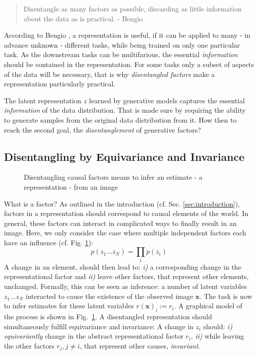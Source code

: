 	\begin{quote}
		{Disentangle as many factors as possible, discarding as little information about the data as is practical.} - Bengio \etal \cite{bengio13rep} %
	\end{quote}

	According to Bengio \etal \cite{bengio13rep}, a representation is useful, if it can be applied to many - in advance unknown - different tasks, while being trained on only one particular task.
	As the downstream tasks can be multifarious, the essential \textit{information} should be contained in the representation.
	For some tasks only a subset of aspects of the data will be necessary, that is why \textit{disentangled factors} make a representation particularly practical.

	The latent representation $z$ learned by generative models captures the essential \textit{information} of the data distribution. That is made sure by requiring the ability to generate samples from the original data distribution from it.
	How then to reach the second goal, the \textit{disentanglement} of generative factors?

	\subsection{Disentangling by Equivariance and Invariance}
		\begin{figure}[htp]
			\centering
			
			\caption{Disentangling causal factors means to infer an estimate - \ie a representation - from an image}
			\label{fig:infer}
		\end{figure}

		What is a factor? As outlined in the introduction (cf. Sec. \ref{sec:introduction}), factors in a representation should correspond to causal elements of the world.
		In general, these factors can interact in complicated ways to finally result in an image. Here, we only consider the case where multiple independent factors each have an influence (cf. Fig. \ref{fig:infer}):
		\begin{equation}\label{eq:independent}
			p(z_1 \ldots z_N) = \prod_i p(z_i)
		\end{equation}
		A change in an element, should then lead to: \emph{i)} a corresponding change in the representational factor and \emph{ii)} leave other factors, that represent other elements, unchanged.
		Formally, this can be seen as inference: a number of latent variables ${z_1}\ldots{z_N}$ interacted to cause the existence of the observed image $\mathbf{x}$. The task is now to infer estimates for these latent variables $r(\mathbf{x})_i:=r_i$. A graphical model of the process is shown in Fig.~\ref{fig:infer}.
		A disentangled representation should simultaneously fulfill equivariance and invariance: A change in ${z_i}$ should: \emph{i)} \textit{equivariantly} change in the abstract representational factor $r_i$, \emph{ii)} while leaving the other factors $r_j, j\neq i$, that represent other causes, \textit{invariant}.


